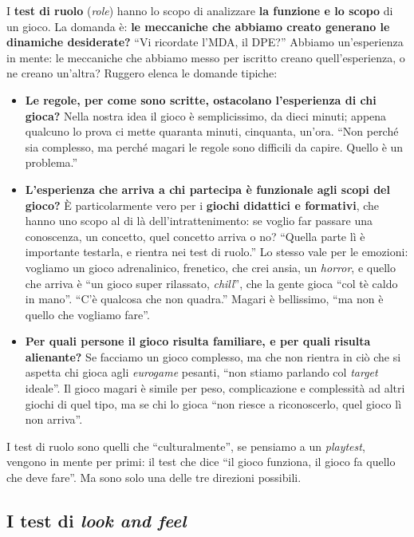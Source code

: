 I \textbf{test di ruolo} (\emph{role}) hanno lo scopo di analizzare \textbf{la funzione
e lo scopo} di un gioco. La domanda è: \textbf{le meccaniche che abbiamo creato generano
le dinamiche desiderate?} ``Vi ricordate l'MDA, il DPE?'' Abbiamo un'esperienza in
mente: le meccaniche che abbiamo messo per iscritto creano quell'esperienza, o ne creano
un'altra? Ruggero elenca le domande tipiche:
\begin{itemize}
  \item \textbf{Le regole, per come sono scritte, ostacolano l'esperienza di chi gioca?}
        Nella nostra idea il gioco è semplicissimo, da dieci minuti; appena qualcuno lo
        prova ci mette quaranta minuti, cinquanta, un'ora. ``Non perché sia complesso,
        ma perché magari le regole sono difficili da capire. Quello è un problema.''
  \item \textbf{L'esperienza che arriva a chi partecipa è funzionale agli scopi del
        gioco?} È particolarmente vero per i \textbf{giochi didattici e formativi}, che
        hanno uno scopo al di là dell'intrattenimento: se voglio far passare una
        conoscenza, un concetto, quel concetto arriva o no? ``Quella parte lì è
        importante testarla, e rientra nei test di ruolo.'' Lo stesso vale per le
        emozioni: vogliamo un gioco adrenalinico, frenetico, che crei ansia, un
        \emph{horror}, e quello che arriva è ``un gioco super rilassato, \emph{chill}'',
        che la gente gioca ``col tè caldo in mano''. ``C'è qualcosa che non quadra.'' Magari
        è bellissimo, ``ma non è quello che vogliamo fare''.
  \item \textbf{Per quali persone il gioco risulta familiare, e per quali risulta
        alienante?} Se facciamo un gioco complesso, ma che non rientra in ciò che si
        aspetta chi gioca agli \emph{eurogame} pesanti, ``non stiamo parlando col
        \emph{target} ideale''. Il gioco magari è simile per peso, complicazione e
        complessità ad altri giochi di quel tipo, ma se chi lo gioca ``non riesce a
        riconoscerlo, quel gioco lì non arriva''.
\end{itemize}
I test di ruolo sono quelli che ``culturalmente'', se pensiamo a un \emph{playtest},
vengono in mente per primi: il test che dice ``il gioco funziona, il gioco fa quello che
deve fare''. Ma sono solo una delle tre direzioni possibili.

\subsection{I test di \emph{look and feel}}

